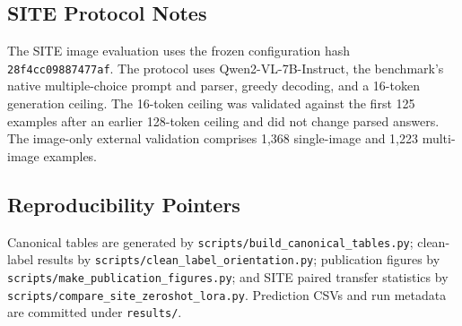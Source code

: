\subsection{SITE Protocol Notes}
The SITE image evaluation uses the frozen configuration hash \texttt{28f4cc09887477af}. The protocol uses Qwen2-VL-7B-Instruct, the benchmark's native multiple-choice prompt and parser, greedy decoding, and a 16-token generation ceiling. The 16-token ceiling was validated against the first 125 examples after an earlier 128-token ceiling and did not change parsed answers. The image-only external validation comprises 1,368 single-image and 1,223 multi-image examples.

\subsection{Reproducibility Pointers}
Canonical tables are generated by \texttt{scripts/build\_canonical\_tables.py}; clean-label results by \texttt{scripts/clean\_label\_orientation.py}; publication figures by \texttt{scripts/make\_publication\_figures.py}; and SITE paired transfer statistics by \texttt{scripts/compare\_site\_zeroshot\_lora.py}. Prediction CSVs and run metadata are committed under \texttt{results/}.
